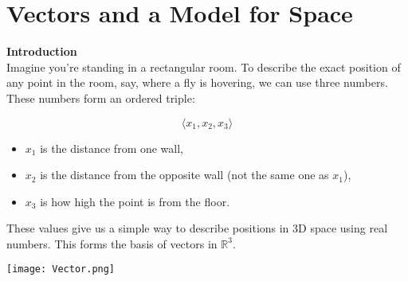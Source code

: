 \documentclass[11pt]{article}
\begin{document}


\section{Vectors and a Model for Space}


\textbf{Introduction}
\\
Imagine you're standing in a rectangular room. To describe the exact position of any point in the room, say, 
where a fly is hovering, we can use three numbers. These numbers form an ordered triple:

\[
\langle x_1, x_2, x_3 \rangle
\]
\begin{itemize}
\item $x_1$ is the distance from one wall,
\item $x_2$ is the distance from the opposite wall (not the same one as $x_1$),
\item $x_3$ is how high the point is from the floor.
\end{itemize}


These values give us a simple way to describe positions in 3D space using real numbers. 
This forms the basis of vectors in $\mathbb{R}^3$.
\begin{center}
  \texttt{[image: Vector.png]}
\end{center}



\newpage






\end{document}
